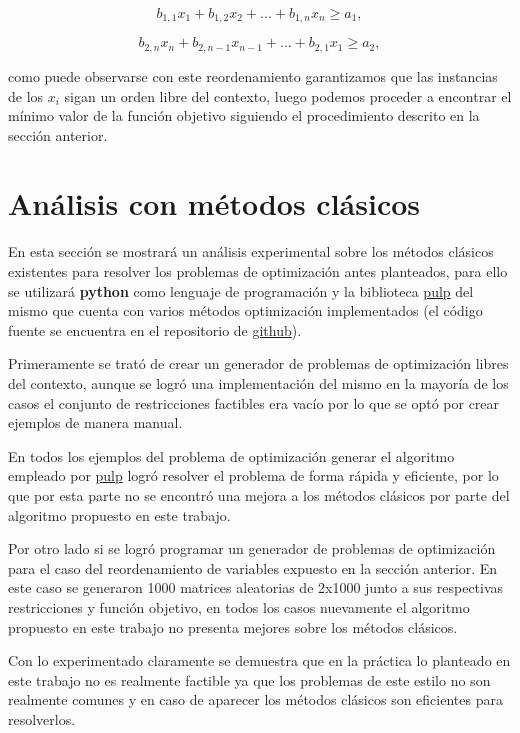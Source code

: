 \documentclass{article}
\begin{document}
\begin{equation}
    b_{1,1}x_1+b_{1,2}x_2+...+b_{1,n}x_n \geq a_1,
\end{equation}

\begin{equation}
    b_{2,n}x_n+b_{2,n-1}x_{n-1}+...+b_{2,1}x_1 \geq a_2,
\end{equation}

como puede observarse con este reordenamiento garantizamos que las instancias de los $x_i$ sigan un orden libre del contexto, luego podemos proceder 
a encontrar el mínimo valor de la función objetivo siguiendo el procedimiento descrito en la sección anterior.


\section*{Análisis con métodos clásicos}

En esta sección se mostrará un análisis experimental sobre los métodos clásicos existentes para resolver los problemas de optimización antes
planteados, para ello se utilizará \textbf{python} como lenguaje de programación y la biblioteca \href{https://pypi.org/project/PuLP/}{pulp} del mismo 
que cuenta con varios métodos optimización implementados (el código fuente se encuentra en el repositorio de \href{https://github.com/ARJ-Code/MMA-Project}{github}).

Primeramente se trató de crear un generador de problemas de optimización libres del contexto, aunque se logró una implementación del mismo en la mayoría
de los casos el conjunto de restricciones factibles era vacío por lo que se optó por crear ejemplos de manera manual.

En todos los ejemplos del problema de optimización generar el algoritmo empleado por \href{https://pypi.org/project/PuLP/}{pulp} logró resolver el problema
de forma rápida y eficiente, por lo que por esta parte no se encontró una mejora a los métodos clásicos por parte del algoritmo propuesto en este trabajo.

Por otro lado si se logró programar un generador de problemas de optimización para el caso del reordenamiento de variables expuesto en la sección anterior.
En este caso se generaron 1000 matrices aleatorias de 2x1000 junto a sus respectivas restricciones y función objetivo, en todos los casos nuevamente el algoritmo
propuesto en este trabajo no presenta mejores sobre los métodos clásicos.

Con lo experimentado claramente se demuestra que en la práctica lo planteado en este trabajo no es realmente factible ya que los problemas de este estilo 
no son realmente comunes y en caso de aparecer los métodos clásicos son eficientes para resolverlos.
\end{document}
